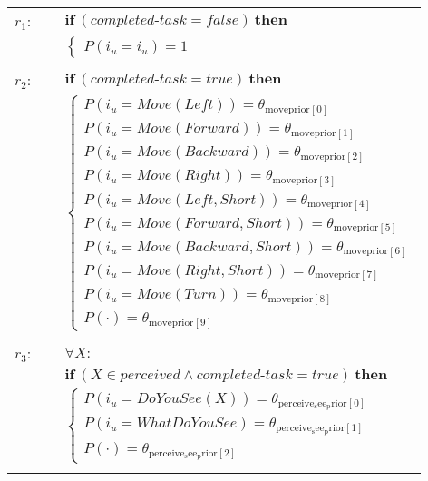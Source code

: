 \begin{footnotesize}
\begin{longtable}{p{2cm}l}
$r_{1}$: \ \ &  $ \textbf{if} \ (\mathit{completed\mbox{-}task}\!=\!\mathit{false}) \ \textbf{then}$ \\
& \;\;\;\;\; $ \begin{cases}P(\mathit{i_u}\!=\!\mathit{{i_u}})\!=\!1 \end{cases}$ \\ \\[-2mm]
$r_{2}$: \ \ & $ \textbf{if} \ (\mathit{completed\mbox{-}task}\!=\!\mathit{true}) \ \textbf{then} $ \\
 & \;\;\;\;\; $ \begin{cases}P(\mathit{i_u}\!=\!\mathit{Move(Left)})\!=\!\theta_{\mathrm{moveprior[0]}} \\
P(\mathit{i_u}\!=\!\mathit{Move(Forward)})\!=\!\theta_{\mathrm{moveprior[1]}} \\
P(\mathit{i_u}\!=\!\mathit{Move(Backward)})\!=\!\theta_{\mathrm{moveprior[2]}} \\
P(\mathit{i_u}\!=\!\mathit{Move(Right)})\!=\!\theta_{\mathrm{moveprior[3]}} \\
P(\mathit{i_u}\!=\!\mathit{Move(Left,Short)})\!=\!\theta_{\mathrm{moveprior[4]}} \\
P(\mathit{i_u}\!=\!\mathit{Move(Forward,Short)})\!=\!\theta_{\mathrm{moveprior[5]}} \\
P(\mathit{i_u}\!=\!\mathit{Move(Backward,Short)})\!=\!\theta_{\mathrm{moveprior[6]}} \\
P(\mathit{i_u}\!=\!\mathit{Move(Right,Short)})\!=\!\theta_{\mathrm{moveprior[7]}} \\
P(\mathit{i_u}\!=\!\mathit{Move(Turn)})\!=\!\theta_{\mathrm{moveprior[8]}} \\
P(\cdot)\!=\!\theta_{\mathrm{moveprior[9]}} \end{cases}$ \\ \\[-2mm]
$r_{3}$: \ \ & $\forall X: $ \\ & $ \textbf{if} \ (\mathit{X}\!\in\!\mathit{perceived} \land \mathit{completed\mbox{-}task}\!=\!\mathit{true}) \ \textbf{then} $ \\
 & \;\;\;\;\; $ \begin{cases}P(\mathit{i_u}\!=\!\mathit{DoYouSee(X)})\!=\!\theta_{\mathrm{perceive_see_prior[0]}} \\
P(\mathit{i_u}\!=\!\mathit{WhatDoYouSee})\!=\!\theta_{\mathrm{perceive_see_prior[1]}} \\
P(\cdot)\!=\!\theta_{\mathrm{perceive_see_prior[2]}} \end{cases}$ \\ \\[-2mm]

\end{longtable}
\end{footnotesize}
